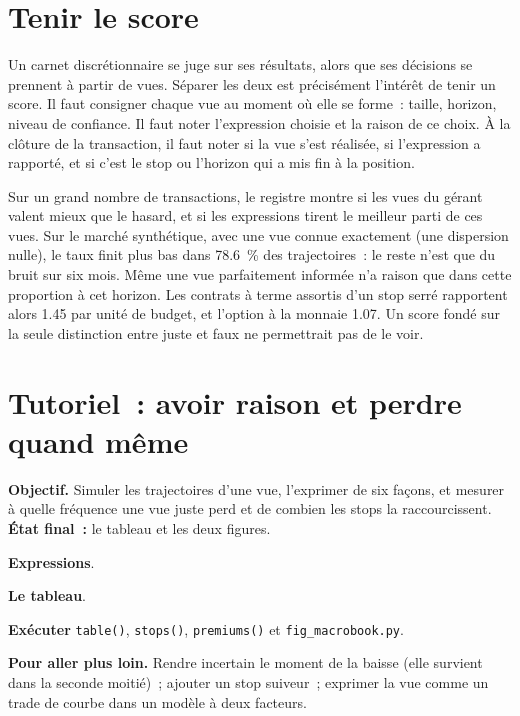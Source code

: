 \section{Tenir le score}

Un carnet discrétionnaire se juge sur ses résultats, alors que ses décisions se prennent à partir de vues. Séparer les deux est précisément l'intérêt de tenir un score. Il faut consigner chaque vue
au moment où elle se forme~: taille, horizon, niveau de confiance. Il faut noter l'expression choisie et la raison de ce choix. À la clôture de la transaction, il faut noter si la vue s'est réalisée,
si l'expression a rapporté, et si c'est le stop ou l'horizon qui a mis fin à la position.

Sur un grand nombre de transactions, le registre montre si les vues du gérant valent mieux que le hasard, et si les expressions tirent le meilleur parti de ces vues. Sur le
marché synthétique, avec une vue connue exactement (une dispersion nulle), le taux finit plus bas dans 78.6~\% des trajectoires~: le reste n'est que du bruit sur six mois.
Même une vue parfaitement informée n'a raison que dans cette proportion à cet horizon. Les contrats à terme assortis d'un stop serré rapportent alors 1.45 par unité de budget, et l'option à la
monnaie 1.07. Un score fondé sur la seule distinction entre juste et faux ne permettrait pas de le voir.

\section{Tutoriel~: avoir raison et perdre quand même}\label{tut:s2:discretionary-macro:tut}

\begin{tutorial}
\textbf{Objectif.} Simuler les trajectoires d'une vue, l'exprimer de six façons, et mesurer à quelle fréquence une vue juste perd et de combien les stops la raccourcissent.
\textbf{État final~:} le tableau et les deux figures.
\begin{tutsteps}
\item \textbf{Expressions}.
\label{lst:s2:discretionary-macro:expressions}
\item \textbf{Le tableau}.
\label{lst:s2:discretionary-macro:table}
\item \textbf{Exécuter} \texttt{table()}, \texttt{stops()}, \texttt{premiums()} et \texttt{fig\_macrobook.py}.
\end{tutsteps}
\textbf{Pour aller plus loin.} Rendre incertain le moment de la baisse (elle survient dans la seconde moitié)~; ajouter un stop suiveur~; exprimer la vue comme
un trade de courbe dans un modèle à deux facteurs.
\end{tutorial}

